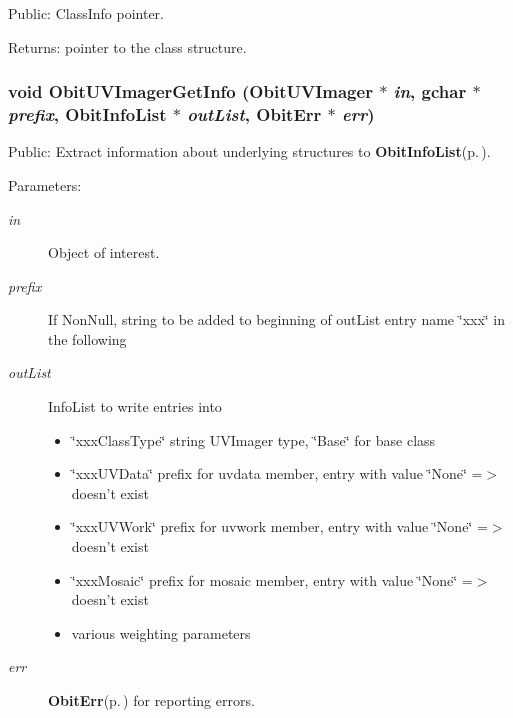 Public: Class\-Info pointer. 

\begin{Desc}
\item[Returns:]pointer to the class structure. \end{Desc}
\subsubsection{\setlength{\rightskip}{0pt plus 5cm}void Obit\-UVImager\-Get\-Info ({\bf Obit\-UVImager} $\ast$ {\em in}, gchar $\ast$ {\em prefix}, {\bf Obit\-Info\-List} $\ast$ {\em out\-List}, {\bf Obit\-Err} $\ast$ {\em err})}\label{ObitUVImager_8c_a17}


Public: Extract information about underlying structures to {\bf Obit\-Info\-List}{\rm (p.\,\pageref{structObitInfoList})}. 

\begin{Desc}
\item[Parameters:]
\begin{description}
\item[{\em in}]Object of interest. \item[{\em prefix}]If Non\-Null, string to be added to beginning of out\-List entry name \char`\"{}xxx\char`\"{} in the following \item[{\em out\-List}]Info\-List to write entries into \begin{itemize}
\item \char`\"{}xxx\-Class\-Type\char`\"{} string UVImager type, \char`\"{}Base\char`\"{} for base class \item \char`\"{}xxx\-UVData\char`\"{} prefix for uvdata member, entry with value \char`\"{}None\char`\"{} =$>$ doesn't exist \item \char`\"{}xxx\-UVWork\char`\"{} prefix for uvwork member, entry with value \char`\"{}None\char`\"{} =$>$ doesn't exist \item \char`\"{}xxx\-Mosaic\char`\"{} prefix for mosaic member, entry with value \char`\"{}None\char`\"{} =$>$ doesn't exist \item various weighting parameters \end{itemize}
\item[{\em err}]{\bf Obit\-Err}{\rm (p.\,\pageref{structObitErr})} for reporting errors. \end{description}
\end{Desc}
